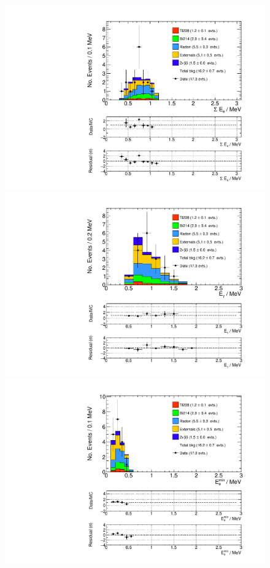 \documentclass[main.tex]{subfiles}
\begin{document}
\begin{figure} [h!]
\begin{center}
\includegraphics[scale=0.37]{pictures/FinalResults/bb2nu2/150/SEe_bb2nu2NS.pdf}
\includegraphics[scale=0.37]{pictures/FinalResults/bb2nu2/150/Eg_bb2nu2NS.pdf}
\includegraphics[scale=0.37]{pictures/FinalResults/bb2nu2/150/Eemin_bb2nu2NS.pdf}

\end{center}
\end{figure}
\end{document}
